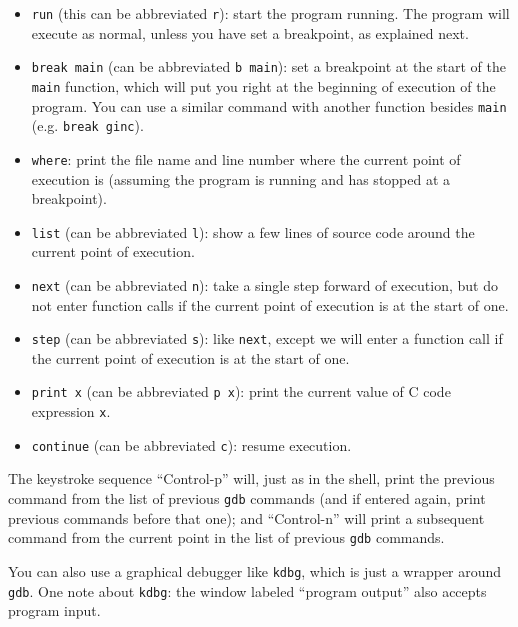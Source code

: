 \documentclass{book}[12pt]
\begin{document}
\begin{itemize}
\item \texttt{run} (this can be abbreviated \texttt{r}): start the program running.
The program will execute as normal, unless you have set a breakpoint, as explained
next.

\item \texttt{break main} (can be abbreviated \texttt{b main}): set a
breakpoint at the start of the \texttt{main} function, which will put
you right at the beginning of execution of the program.  You can use a
similar command with another function besides \texttt{main}
(e.g. \texttt{break ginc}).

\item \texttt{where}: print the file name and line number where the
current point of execution is (assuming the program is running and has
stopped at a breakpoint).

\item \texttt{list} (can be abbreviated \texttt{l}): show a few lines
of source code around the current point of execution.

\item \texttt{next} (can be abbreviated \texttt{n}): take a single step
forward of execution, but do not enter function calls if the current point
of execution is at the start of one.

\item \texttt{step} (can be abbreviated \texttt{s}): like
\texttt{next}, except we will enter a function call if the current
point of execution is at the start of one.

\item \texttt{print x} (can be abbreviated \texttt{p x}): print the current
value of C code expression \texttt{x}.  

\item \texttt{continue} (can be abbreviated \texttt{c}): resume execution.

\end{itemize}

\noindent The keystroke sequence ``Control-p'' will, just as in the
shell, print the previous command from the list of previous
\texttt{gdb} commands (and if entered again, print previous commands
before that one); and ``Control-n'' will print a subsequent command
from the current point in the list of previous \texttt{gdb} commands.

You can also use a graphical debugger like \texttt{kdbg}, which is
just a wrapper around \texttt{gdb}.  One note about \texttt{kdbg}: the
window labeled ``program output'' also accepts program input.
\end{document}
